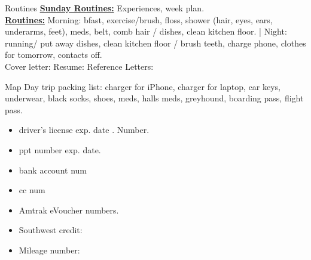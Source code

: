 \documentclass[serif, mathserif, final]{beamer}
\begin{document}
\begin{frame}
  \begin{columns}
    \begin{column}{0.25\linewidth} %

      \begin{block}{Routines}
        \textbf{\underline{Sunday Routines:}} Experiences, week plan. \\ 
        \textbf{\underline{Routines:}} Morning: bfast, exercise/brush,
        floss, shower (hair, eyes, ears, underarms, feet), meds, belt,
        comb hair / dishes, clean kitchen floor. |  Night: running/ put away dishes, clean kitchen floor / brush
        teeth, charge phone, clothes for tomorrow, contacts off. \\
        Cover letter: 
        Resume: 
        Reference Letters:  
      \end{block} 

      \begin{block}{Map} 
        Day trip packing list: charger for iPhone, charger for laptop, car
        keys, underwear, black socks, shoes, meds, halls meds, greyhound,
        boarding pass, flight pass. 

        \begin{itemize} 
          \item \tiny driver's license  exp. date .  Number. 
          \item \tiny ppt number  exp. date.  
        \end{itemize}

        \begin{itemize} 
        \item \tiny bank account num 
        \item \tiny cc num 
        \end{itemize} 
        
        \begin{itemize} 
          \tiny \item \tiny Amtrak  eVoucher numbers. \\
         \item \tiny  Southwest credit:  \\   
         \item \tiny  Mileage number: \\ 
        \end{itemize} 


\end{block}
\end{column}
\end{columns}
\end{frame}
\end{document}
